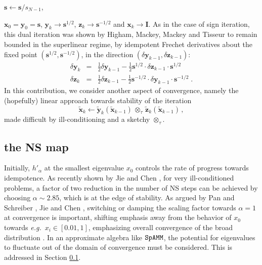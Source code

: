 \documentclass[letterpaper,twocolumn,amsmath,amsfont,amssymb,english,aps,jcp,preprintnumbers,groupaddress,nofootinbib,tightenlines,floatfix]{revtex4}
\newcommand{\mat}[1]{\boldsymbol{#1}}
\newcommand{\ot}{  {\scriptstyle \otimes}_{ \tau } }
\theoremstyle{plain}
\theoremstyle{remark}
\theoremstyle{plain}
\begin{document}
 $\mat{s} \leftarrow \mat{s}/s_{N-1}$, 

$\mat{x}_0=\mat{y}_0=\mat{s}$, ${\mat{y}}_k \rightarrow
\mat{s}^{1/2}$, ${\mat{z}}_k \rightarrow \mat{s}^{-1/2}$ and
${\mat{x}}_k \rightarrow {\mat{I}}$.  As in the case of sign
iteration, this dual iteration was shown by Higham, Mackey, Mackey and
Tisseur \cite{Higham2005} to remain bounded in the superlinear regime,
by idempotent Frechet derivatives about the fixed point
$\left(\mat{s}^{1/2},\mat{s}^{-1/2}\right)$, in the direction $\left(
\delta \mat{y}_{k-1} , \delta \mat{z}_{k-1} \right)$:
\begin{eqnarray}
\delta \mat{y}_k &=& \frac{1}{2} \delta \mat{y}_{k-1} - \frac{1}{2} \mat{s}^{1/2} \cdot \delta \mat{z}_{k-1} \cdot \mat{s}^{1/2} \\
\delta \mat{z}_k &=& \frac{1}{2} \delta \mat{z}_{k-1} - \frac{1}{2} \mat{s}^{-1/2} \cdot \delta \mat{y}_{k-1} \cdot \mat{s}^{-1/2} \;.
\end{eqnarray}
In this contribution, we consider another aspect of convergence,
namely the (hopefully) linear approach towards stability of the
iteration
\begin{equation}
\widetilde{\mat{x}}_k \leftarrow
 \widetilde{\mat{y}}_k \left( \widetilde{\mat{x}}_{k-1} \right)
\, \ot \, \widetilde{\mat{z}}_k \left( \widetilde{\mat{x}}_{k-1} \right) \, ,
\end{equation}
made difficult by ill-conditioning and a sketchy $\ot$.

\subsection{the NS map}

Initially, $h'_\alpha$ at the smallest eigenvalue $x_0$ controls the
rate of progress towards idempotence.  As recently shown by Jie and
Chen \cite{Chen2014}, for very ill-conditioned problems, a factor of
two reduction in the number of NS steps can be achieved by choosing
$\alpha \sim 2.85$, which is at the edge of stability.  As argued by
Pan and Schreiber \cite{Pan1991}, Jie and Chen \cite{Chen2014},
switching or damping the scaling factor towards $\alpha=1$ at
convergence is important, shifting emphasis away from the behavior of
$x_0$ towards {\em e.g.}~$x_i \in [0.01,1]$, emphasizing overall
convergence of the broad distribution \cite{Pan and Scriber}.  In an
approximate algebra like $\tt SpAMM$, the potential for eigenvalues to
fluctuate out of the domain of convergence must be considered.  This
is addressed in Section \ref{}.
\end{document}
